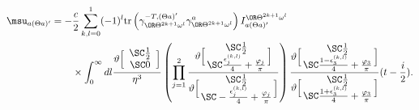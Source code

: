 \begin{equation}
\begin{aligned}
\msu_{a(\Theta a)'}= - & \frac{c}{2}\sum_{k,l=0}^1 (-1)^l
\text{tr}\left(\gamma_{\OR\Theta^{2k+1}\omega^l}^{-T,(\Theta a)'}\gamma_{\OR\Theta^{2k+1}\omega^l}^{a}\right)
 I^{\OR\Theta^{2k+1}\omega^l}_{a(\Theta a)'}  \\
& \times \int_0^{\infty}dl
\frac{\vartheta \Bigl[ \begin{array}{c} \SC \frac{1}{2} \\ \SC 0 \end{array} \Bigr]}{\eta^3}
\left(\prod_{j=1}^2 
\frac{\vartheta \Bigl[\!\! \begin{array}{c}  \SC \frac{1}{2} \\ \SC \frac{\epsilon^{(k,l)}_j}{4}+\frac{\varphi_j}{\pi}    
\end{array} \!\!\Bigr]}
  {\vartheta \Bigl[\!\! \begin{array}{c}  \SC \frac{1}{2} \\  \SC -\frac{\epsilon^{(k,l)}_j}{4}+\frac{\varphi_j}{\pi}
 \end{array} \!\!\Bigr]}
\right)
\frac{\vartheta \Bigl[\!\! \begin{array}{c}  \SC \frac{1}{2} \\ \SC \frac{1-\epsilon^{(k,l)}_3}{4}+\frac{\varphi_3}{\pi}    
\end{array} \!\!\Bigr]}
  {\vartheta \Bigl[\!\! \begin{array}{c}  \SC \frac{1}{2} \\  \SC \frac{1+\epsilon^{(k,l)}_3}{4}+\frac{\varphi_3}{\pi}
 \end{array} \!\!\Bigr]}
(t-\frac{i}{2}).
\end{aligned}\label{FormulaTreeMSaThetaa}
\end{equation}

